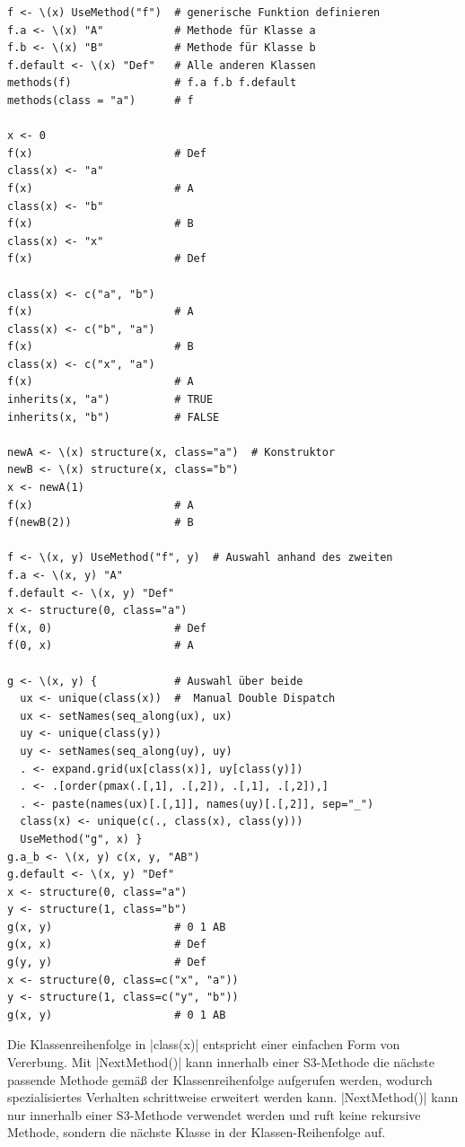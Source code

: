 \documentclass[10pt,twocolumn]{scrartcl}
\renewcommand{\lstinline}{\mycoloredinline}
\begin{document}
\begin{lstlisting}
f <- \(x) UseMethod("f")  # generische Funktion definieren
f.a <- \(x) "A"           # Methode für Klasse a
f.b <- \(x) "B"           # Methode für Klasse b
f.default <- \(x) "Def"   # Alle anderen Klassen
methods(f)                # f.a f.b f.default
methods(class = "a")      # f

x <- 0
f(x)                      # Def
class(x) <- "a"
f(x)                      # A
class(x) <- "b"
f(x)                      # B
class(x) <- "x"
f(x)                      # Def

class(x) <- c("a", "b")
f(x)                      # A
class(x) <- c("b", "a")
f(x)                      # B
class(x) <- c("x", "a")
f(x)                      # A
inherits(x, "a")          # TRUE
inherits(x, "b")          # FALSE

newA <- \(x) structure(x, class="a")  # Konstruktor
newB <- \(x) structure(x, class="b")
x <- newA(1)
f(x)                      # A
f(newB(2))                # B

f <- \(x, y) UseMethod("f", y)  # Auswahl anhand des zweiten
f.a <- \(x, y) "A"
f.default <- \(x, y) "Def"
x <- structure(0, class="a")
f(x, 0)                   # Def
f(0, x)                   # A

g <- \(x, y) {            # Auswahl über beide
  ux <- unique(class(x))  #  Manual Double Dispatch
  ux <- setNames(seq_along(ux), ux)
  uy <- unique(class(y))
  uy <- setNames(seq_along(uy), uy)
  . <- expand.grid(ux[class(x)], uy[class(y)])
  . <- .[order(pmax(.[,1], .[,2]), .[,1], .[,2]),]
  . <- paste(names(ux)[.[,1]], names(uy)[.[,2]], sep="_")
  class(x) <- unique(c(., class(x), class(y)))
  UseMethod("g", x) }
g.a_b <- \(x, y) c(x, y, "AB")
g.default <- \(x, y) "Def"
x <- structure(0, class="a")
y <- structure(1, class="b")
g(x, y)                   # 0 1 AB
g(x, x)                   # Def
g(y, y)                   # Def
x <- structure(0, class=c("x", "a"))
y <- structure(1, class=c("y", "b"))
g(x, y)                   # 0 1 AB
\end{lstlisting}

Die Klassenreihenfolge in \lstinline|class(x)| entspricht einer einfachen Form von Vererbung. Mit \lstinline|NextMethod()| kann innerhalb einer S3-Methode die nächste passende Methode gemäß der Klassenreihenfolge aufgerufen werden, wodurch spezialisiertes Verhalten schrittweise erweitert werden kann. \lstinline|NextMethod()| kann nur innerhalb einer S3-Methode verwendet werden und ruft keine rekursive Methode, sondern die nächste Klasse in der Klassen-Reihenfolge auf.
\end{document}
